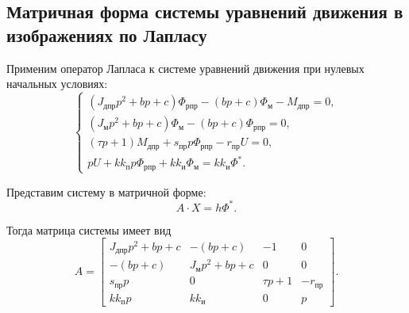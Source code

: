 \subsection{Матричная форма системы уравнений движения в изображениях по Лапласу}

Применим оператор Лапласа к системе уравнений движения при нулевых начальных условиях:
\begin{equation}
\begin{cases}
    \left(
        J_{\text{дпр}}p^2
        +
        bp
        +
        c
    \right)
    \Phi_{\text{рпр}}
    -
    \left(
        bp+c
    \right)
    \Phi_{\text{м}}
    -
    M_{\text{дпр}}
    =
    0,
    \\[0.4em]

    \left(
        J_{\text{м}}p^2
        +
        bp
        +
        c
    \right)
    \Phi_{\text{м}}
    -
    \left(
        bp+c
    \right)
    \Phi_{\text{рпр}}
    =
    0,
    \\[0.4em]

    \left(
        \tau p+1
    \right)
    M_{\text{дпр}}
    +
    s_{\text{пр}}p
    \Phi_{\text{рпр}}
    -
    r_{\text{пр}}U
    =
    0,
    \\[0.4em]

    pU
    +
    kk_{\text{п}}p
    \Phi_{\text{рпр}}
    +
    kk_{\text{и}}
    \Phi_{\text{м}}
    =
    kk_{\text{и}}
    \Phi^*.
\end{cases}
\end{equation}

Представим систему в матричной форме:
\[
    A \cdot X = h \Phi^*.
\]

Тогда матрица системы имеет вид
\begin{equation}
    A=
    \begin{bmatrix}
        J_{\text{дпр}}p^2+bp+c
        &
        -(bp+c)
        &
        -1
        &
        0
        \\[0.4em]

        -(bp+c)
        &
        J_{\text{м}}p^2+bp+c
        &
        0
        &
        0
        \\[0.4em]

        s_{\text{пр}}p
        &
        0
        &
        \tau p+1
        &
        -r_{\text{пр}}
        \\[0.4em]

        kk_{\text{п}}p
        &
        kk_{\text{и}}
        &
        0
        &
        p
    \end{bmatrix}.
\end{equation}

